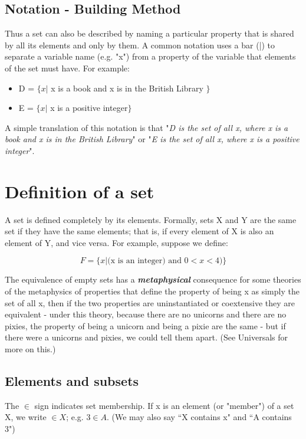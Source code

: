 \documentclass[12pt]{article}
\begin{document}
\subsection{Notation - Building Method}
Thus a set can also be described by naming a particular property that is shared by all its elements and only by them. A common notation uses a bar (|) to separate a variable name (e.g. "x") from a property of the variable that elements of the set must have. For example:
\begin{itemize}
\item D = $\{x |$ x is a book and x is in the British Library $\}$
\item E = $\{x |$ x is a positive integer$\}$
\end{itemize}
A simple translation of this notation is that "\textit{D is the set of all x, where x is a book and x is in the British Library}" or "\textit{E is the set of all x, where x is a positive integer}".

\section{Definition of a set}

A set is defined completely by its elements. Formally, sets X and Y are the same set if they have the same elements; that is, if every element of X is also an element of Y, and vice versa. For example, suppose we define:

\[ F = \{x | \mbox{(x is an integer)} \mbox{ and } 0 < x < 4)\}  \]

The equivalence of empty sets has a \textbf{\textit{metaphysical}} consequence for some theories of the metaphysics of properties that define the property of being x as simply the set of all x, then if the two properties are uninstantiated or coextensive they are equivalent - under this theory, because there are no unicorns and there are no pixies, the property of being a unicorn and being a pixie are the same - but if there were a unicorns and pixies, we could tell them apart. (See Universals for more on this.)

\subsection{Elements and subsets}

The $\in$  sign indicates set membership. If x is an element (or "member") of a set X, we write $ \in X$; e.g. $3\in A$. (We may also say ``X contains x" and ``A contains 3")
\end{document}
